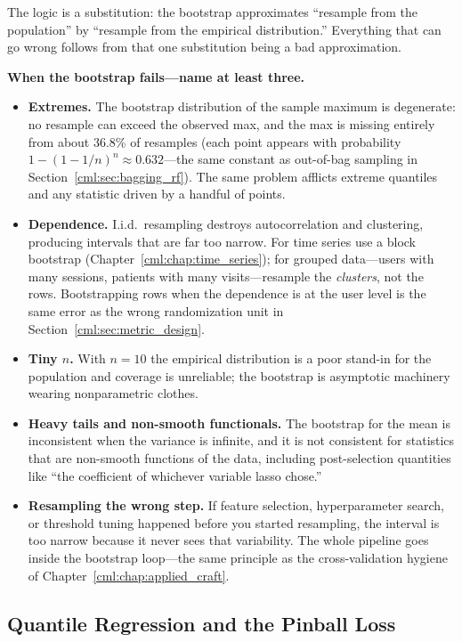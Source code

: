 The logic is a substitution: the bootstrap approximates ``resample from the population'' by ``resample from the empirical distribution.'' Everything that can go wrong follows from that one substitution being a bad approximation.

\begin{warningbox}
\textbf{When the bootstrap fails---name at least three.}
\begin{itemize}
    \item \textbf{Extremes.} The bootstrap distribution of the sample maximum is degenerate: no resample can exceed the observed max, and the max is missing entirely from about 36.8\% of resamples (each point appears with probability $1 - (1-1/n)^n \approx 0.632$---the same constant as out-of-bag sampling in Section~\ref{cml:sec:bagging_rf}). The same problem afflicts extreme quantiles and any statistic driven by a handful of points.
    \item \textbf{Dependence.} I.i.d.\ resampling destroys autocorrelation and clustering, producing intervals that are far too narrow. For time series use a block bootstrap (Chapter~\ref{cml:chap:time_series}); for grouped data---users with many sessions, patients with many visits---resample the \textit{clusters}, not the rows. Bootstrapping rows when the dependence is at the user level is the same error as the wrong randomization unit in Section~\ref{cml:sec:metric_design}.
    \item \textbf{Tiny $n$.} With $n = 10$ the empirical distribution is a poor stand-in for the population and coverage is unreliable; the bootstrap is asymptotic machinery wearing nonparametric clothes.
    \item \textbf{Heavy tails and non-smooth functionals.} The bootstrap for the mean is inconsistent when the variance is infinite, and it is not consistent for statistics that are non-smooth functions of the data, including post-selection quantities like ``the coefficient of whichever variable lasso chose.''
    \item \textbf{Resampling the wrong step.} If feature selection, hyperparameter search, or threshold tuning happened before you started resampling, the interval is too narrow because it never sees that variability. The whole pipeline goes inside the bootstrap loop---the same principle as the cross-validation hygiene of Chapter~\ref{cml:chap:applied_craft}.
\end{itemize}
\end{warningbox}

\subsection{Quantile Regression and the Pinball Loss}

